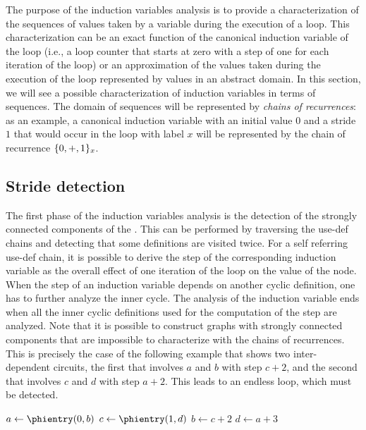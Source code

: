 {The purpose of the induction variables analysis is to provide a characterization of the sequences of values taken by a variable during the execution of a loop. 
This characterization can be an exact function of the canonical induction variable of the loop (i.e., a loop counter that starts at zero with a step of one for each iteration of the loop) or an approximation of the values taken during the execution of the loop represented by values in an abstract domain. 
In this section, we will see a possible characterization of induction variables in terms of sequences. 
The domain of sequences will be represented by {\em chains of recurrences}: 
as an example, a canonical induction variable with an initial value $0$ and a stride $1$ that would occur in the loop with label $x$ will be represented by the chain of recurrence $\{0, +, 1\}_x$.

\subsection{Stride detection}

The first phase of the induction variables analysis is the detection of the strongly connected components of the \SSA{}. 
This can be performed by traversing the use-def \SSA{} chains and detecting that some definitions are visited twice. 
For a self referring use-def chain, it is possible to derive the step of the corresponding induction variable as the overall effect of one iteration of the loop on the value of the \loopphi{} node. 
When the step of an induction variable depends on another cyclic definition, one has to further analyze the inner cycle. 
The analysis of the induction variable ends when all the inner cyclic definitions used for the computation of the step are analyzed. 
Note that it is possible to construct \SSA{} graphs with strongly connected components that are impossible to characterize with the chains of recurrences. 
This is precisely the case of the following example that shows two inter-dependent circuits, the first that involves $a$ and $b$ with step $c+2$, and the second that involves $c$ and $d$ with step $a+2$. 
This leads to an endless loop, which must be detected.

\begin{algorithm}[H]
$a\gets \phientry(0,b)$\;
$c\gets \phientry(1,d)$\;
$b\gets c+2$\;
$d\gets a+3$\;
\end{algorithm}

}
